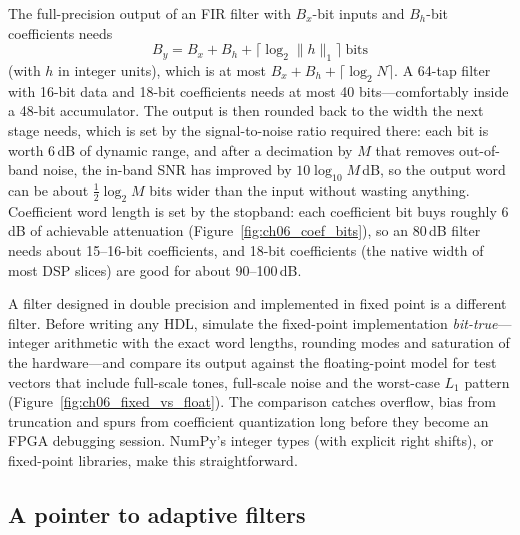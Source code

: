 The full-precision output of an FIR filter with $B_x$-bit inputs and $B_h$-bit coefficients needs
\begin{equation}
B_y=B_x+B_h+\bigl\lceil\log_2\|h\|_1\bigr\rceil\ \text{bits}
\end{equation}
(with $h$ in integer units), which is at most $B_x+B_h+\lceil\log_2N\rceil$. A 64-tap filter with
16-bit data and 18-bit coefficients needs at most 40 bits---comfortably inside a 48-bit
accumulator. The output is then rounded back to the width the next stage needs, which is set by the
signal-to-noise ratio required there: each bit is worth 6\,dB of dynamic range, and after a
decimation by $M$ that removes out-of-band noise, the in-band SNR has improved by
$10\log_{10}M$\,dB, so the output word can be about $\tfrac12\log_2M$ bits wider than the input
without wasting anything. Coefficient word length is set by the stopband: each coefficient bit buys
roughly 6\,dB of achievable attenuation (Figure~\ref{fig:ch06_coef_bits}), so an 80\,dB filter
needs about 15--16-bit coefficients, and 18-bit coefficients (the native width of most DSP
slices) are good for about 90--100\,dB.


\begin{pitfall}
A filter designed in double precision and implemented in fixed point is a different filter. Before
writing any HDL, simulate the fixed-point implementation \emph{bit-true}---integer arithmetic with
the exact word lengths, rounding modes and saturation of the hardware---and compare its output
against the floating-point model for test vectors that include full-scale tones, full-scale noise
and the worst-case $L_1$ pattern (Figure~\ref{fig:ch06_fixed_vs_float}). The comparison catches overflow, bias from truncation and
spurs from coefficient quantization long before they become an FPGA debugging session. NumPy's
integer types (with explicit right shifts), or fixed-point libraries, make this straightforward.
\end{pitfall}

\subsection{A pointer to adaptive filters}

